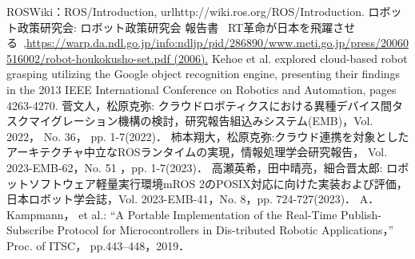\documentclass[11pt]{ujarticle}
\begin{document}
\begin{thebibliography}{99}
	ROSWiki：ROS/Introduction, url{http://wiki.ros.org/ROS/Introduction.}
	ロボット政策研究会: ロボット政策研究会 報告書 ~RT革命が日本を飛躍させる~,\url{https://warp.da.ndl.go.jp/info:ndljp/pid/286890/www.meti.go.jp/press/20060516002/robot-houkokusho-set.pdf (2006).}
	Kehoe et al. explored cloud-based robot grasping utilizing the Google object recognition engine, presenting their findings in the 2013 IEEE International Conference on Robotics and Automation, pages 4263-4270.
	菅文人，松原克弥: クラウドロボティクスにおける異種デバイス間タスクマイグレーション機構の検討，研究報告組込みシステム(EMB)，Vol. 2022， No. 36， pp. 1-7(2022)．
	柿本翔大，松原克弥:クラウド連携を対象としたアーキテクチャ中立なROSランタイムの実現，情報処理学会研究報告， Vol. 2023-EMB-62，No. 51 ，pp. 1-7(2023)．
	高瀬英希，田中晴亮，細合晋太郎: ロボットソフトウェア軽量実行環境mROS 2のPOSIX対応に向けた実装および評価，日本ロボット学会誌，Vol. 2023-EMB-41，No. 8，pp. 724-727(2023)．
	A． Kampmann， et al.: “A Portable Implementation of the Real-Time Publish-Subscribe Protocol for Microcontrollers in Dis-tributed Robotic Applications，” Proc. of ITSC， pp.443–448，2019．
\end{thebibliography}
\end{document}
